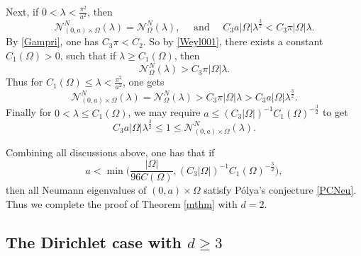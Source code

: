 \documentclass[11pt,letterpaper]{amsart}
\numberwithin{equation}{section}
\theoremstyle{plain}
\theoremstyle{plain}
\numberwithin{equation}{section}
\theoremstyle{remark}
\begin{document}
	Next, if $0< \lambda< \frac{\pi^2}{a^2}$, then  
	\[
	\mathcal N^N_{(0,a)\times\Omega}(\lambda)= \mathcal N^N_{\Omega}(\lambda),\quad  \text{ and }\quad  C_3 a|\Omega|\lambda^{\frac{3}{2}}< C_3\pi|\Omega|\lambda.
	\]
	By \eqref{Gampri}, one has $C_{3}\pi< C_2$. So by \eqref{Weyl001}, there exists a constant $C_1(\Omega)>0$, such that if $\lambda\ge C_1(\Omega)$, then
	\[
	\mathcal N^N_\Omega(\lambda)> C_{3}\pi|\Omega|\lambda.
	\] 
	Thus for $C_1(\Omega)\le \lambda< \frac{\pi^2}{a^2}$, one gets
	\[
	\mathcal N^N_{(0,a)\times \Omega}(\lambda)= \mathcal N^N_\Omega(\lambda)> C_{3}\pi|\Omega|\lambda > C_{3}a|\Omega|\lambda^{\frac{3}{2}}.
	\]
	Finally for $0< \lambda\le C_1(\Omega)$, we may require $a\le (C_{3}|\Omega|)^{-1} C_1(\Omega)^{-\frac{3}{2}}$ to get 
	\[
	C_{3}a|\Omega|\lambda^{\frac{3}{2}}\le 1\le \mathcal N^N_{(0,a)\times \Omega}(\lambda).
	\]
	
	Combining  all discussions above, one has that if 
	\begin{equation}\label{caseNeud2}
		a< \min\bigg(\frac{|\Omega|}{96 C(\Omega)}, (C_{3}|\Omega|)^{-1} C_1(\Omega)^{-\frac{3}{2}}\bigg),
	\end{equation}
	then all Neumann eigenvalues of $(0,a)\times \Omega$ satisfy P\'olya's conjecture \eqref{PCNeu}. Thus we complete the proof of Theorem \ref{mthm} with $d=2$.
	
	\subsection{The Dirichlet case with $d\ge 3$}	\label{subsecDiri3}
	
\end{document}
